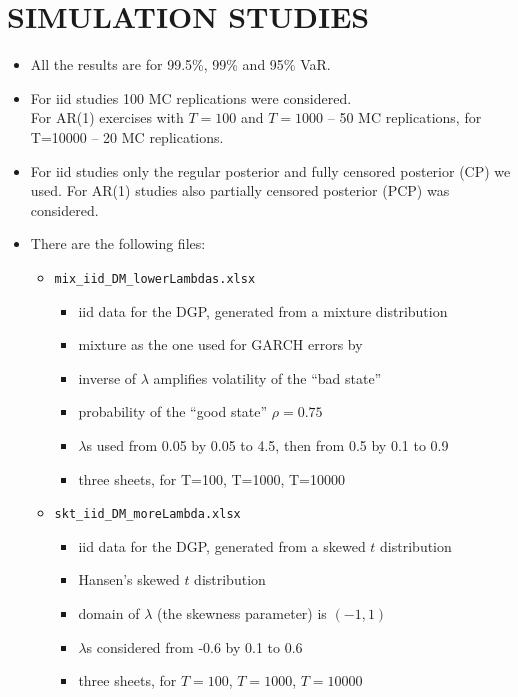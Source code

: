 \documentclass[a4paper,10pt]{article} %
\begin{document}
\section{SIMULATION STUDIES}
\begin{itemize}
\item  All the results are for 99.5\%, 99\% and 95\% VaR.
\item  For iid studies 100 MC replications were considered.\\
For AR(1) exercises with $T=100$ and $T=1000$ -- 50 MC replications, for T=10000 -- 20 MC replications.
\item  For iid studies only the regular posterior and fully censored posterior (CP) we used.
For AR(1) studies also partially censored posterior (PCP) was considered.
\item There are the following files:

\begin{itemize}
\item \texttt{mix\_iid\_DM\_lowerLambdas.xlsx}
\begin{itemize}
\item  iid data for the DGP, generated from a mixture distribution
\item  mixture as the one used for GARCH errors by \citet{mix_garch}
\item  inverse of $\lambda$ amplifies volatility of the ``bad state''
\item  probability of the ``good state'' $\rho = 0.75$
\item  $\lambda$s  used from 0.05 by 0.05 to 4.5, then from 0.5 by 0.1 to 0.9
\item  three sheets, for T=100, T=1000, T=10000
\end{itemize}

\item \texttt{skt\_iid\_DM\_moreLambda.xlsx}
\begin{itemize}
\item iid data for the DGP, generated from a skewed $t$ distribution
\item  Hansen's skewed $t$ distribution \citep{hansen_skt}
\item  domain of $\lambda$ (the skewness parameter) is $(-1,1)$
\item  $\lambda$s  considered from -0.6 by 0.1 to 0.6
\item  three sheets, for $T=100$, $T=1000$, $T=10000$
\end{itemize}


\end{itemize}
\end{itemize}
\end{document}
